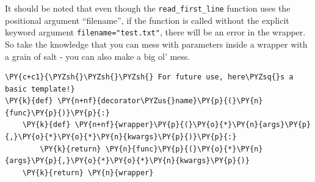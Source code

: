     It should be noted that even though the \texttt{read\_first\_line}
function uses the positional argument ``filename'', if the function is
called without the explicit keyword argument
\texttt{filename="test.txt"}, there will be an error in the wrapper. So
take the knowledge that you can mess with parameters inside a wrapper
with a grain of salt - you can also make a big ol' mess.
\newpage
    \begin{tcolorbox}[breakable, size=fbox, boxrule=1pt, pad at break*=1mm,colback=cellbackground, colframe=cellborder]
\begin{Verbatim}[commandchars=\\\{\}]
\PY{c+c1}{\PYZsh{}\PYZsh{}\PYZsh{} For future use, here\PYZsq{}s a basic template!}
\PY{k}{def} \PY{n+nf}{decorator\PYZus{}name}\PY{p}{(}\PY{n}{func}\PY{p}{)}\PY{p}{:}
    \PY{k}{def} \PY{n+nf}{wrapper}\PY{p}{(}\PY{o}{*}\PY{n}{args}\PY{p}{,}\PY{o}{*}\PY{o}{*}\PY{n}{kwargs}\PY{p}{)}\PY{p}{:}
        \PY{k}{return} \PY{n}{func}\PY{p}{(}\PY{o}{*}\PY{n}{args}\PY{p}{,}\PY{o}{*}\PY{o}{*}\PY{n}{kwargs}\PY{p}{)}
    \PY{k}{return} \PY{n}{wrapper}
\end{Verbatim}
\end{tcolorbox}
